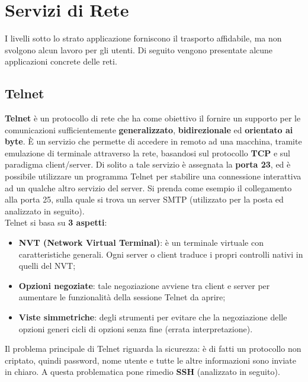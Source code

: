 \section{Servizi di Rete}

    I livelli sotto lo strato applicazione forniscono il trasporto affidabile, ma non svolgono alcun
    lavoro per gli utenti. Di seguito vengono presentate alcune applicazioni concrete delle reti.

    \subsection{Telnet}

        \textbf{Telnet} è un protocollo di rete che ha come obiettivo il fornire un supporto per le comunicazioni
        sufficientemente \textbf{generalizzato}, \textbf{bidirezionale} ed \textbf{orientato ai byte}. È un servizio che
        permette di accedere in remoto ad una macchina, tramite emulazione di terminale attraverso
        la rete, basandosi sul protocollo \textbf{TCP} e sul paradigma client/server. Di solito a tale servizio è
        assegnata la \textbf{porta 23}, ed è possibile utilizzare un programma Telnet per stabilire una
        connessione interattiva ad un qualche altro servizio del server. Si prenda come esempio il
        collegamento alla porta 25, sulla quale si trova un server SMTP (utilizzato per la posta ed
        analizzato in seguito).\\

        Telnet si basa su \textbf{3 aspetti}:

        \begin{itemize}
            \item \textbf{NVT (Network Virtual Terminal)}: è un terminale virtuale con caratteristiche generali. Ogni server o client traduce i propri controlli nativi in quelli del NVT;
            \item \textbf{Opzioni negoziate}: tale negoziazione avviene tra client e server per aumentare le funzionalità della sessione Telnet da aprire;
            \item \textbf{Viste simmetriche}: degli strumenti per evitare che la negoziazione delle opzioni generi
            cicli di opzioni senza fine (errata interpretazione).
        \end{itemize}

        Il problema principale di Telnet riguarda la sicurezza: è di fatti un protocollo non criptato,
        quindi password, nome utente e tutte le altre informazioni sono inviate in chiaro. A questa
        problematica pone rimedio \textbf{SSH} (analizzato in seguito).

